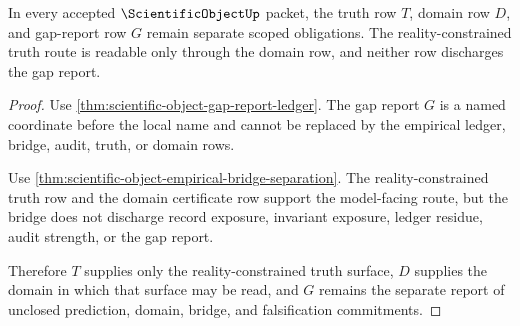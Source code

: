 \begin{theorem}
\label{thm:scientific-object-truth-domain-gap-scope}
In every accepted $\ScientificObjectUp$ packet, the truth row $T$, domain row $D$, and gap-report row $G$ remain separate scoped obligations. The reality-constrained truth route is readable only through the domain row, and neither row discharges the gap report.
\end{theorem}
\begin{proof}
Use \autoref{thm:scientific-object-gap-report-ledger}. The gap report $G$ is a named coordinate before the local name and cannot be replaced by the empirical ledger, bridge, audit, truth, or domain rows.

Use \autoref{thm:scientific-object-empirical-bridge-separation}. The reality-constrained truth row and the domain certificate row support the model-facing route, but the bridge does not discharge record exposure, invariant exposure, ledger residue, audit strength, or the gap report.

Therefore $T$ supplies only the reality-constrained truth surface, $D$ supplies the domain in which that surface may be read, and $G$ remains the separate report of unclosed prediction, domain, bridge, and falsification commitments.
\end{proof}

